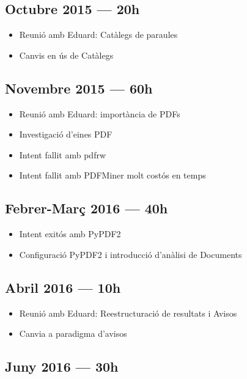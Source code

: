 \documentclass{article}
\begin{document}
\subsection{Octubre 2015 --- 20h}

\begin{itemize}
    \item Reunió amb Eduard: Catàlegs de paraules
    \item Canvis en ús de Catàlegs
\end{itemize}

\subsection{Novembre 2015 --- 60h}

\begin{itemize}
    \item Reunió amb Eduard: importància de PDFs
    \item Investigació d'eines PDF
    \item Intent fallit amb pdfrw
    \item Intent fallit amb PDFMiner molt costós en temps
\end{itemize}

\subsection{Febrer-Març 2016 --- 40h}

\begin{itemize}
    \item Intent exitós amb PyPDF2
    \item Configuració PyPDF2 i introducció d'anàlisi de Documents
\end{itemize}

\subsection{Abril 2016 --- 10h}

\begin{itemize}
    \item Reunió amb Eduard: Reestructuració de resultats i Avisos
    \item Canvia a paradigma d'avisos
\end{itemize}

\subsection{Juny 2016 --- 30h}
\end{document}
